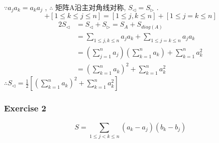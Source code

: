 \begin{solve}
    $ \because a_j a_k = a_k a_j $ , $ \therefore  $ 矩阵A沿主对角线对称, $ S_{\triangleleft} = S_{\triangleright} $ .
    \begin{equation*}
        [1\leqslant j \leqslant k \leqslant n] + [1\leqslant k \leqslant j \leqslant n] =[1\leqslant j , k \leqslant n] + [1\leqslant j = k \leqslant n]
    \end{equation*}
    \begin{align*}
        2S_{\triangleleft} &= S_{\triangleleft}+S_{\triangleright} = S_{A}+S_{diag(A)} \\
        &= \sum_{1\leqslant j , k \leqslant n} a_j a_k + \sum_{1\leqslant j = k \leqslant n} a_j a_k\\
        &= \left(\sum_{j=1}^{n} a_j\right)\left(\sum_{k=1}^{n} a_k\right) + \sum_{k=1}^{n} a_k^2\\
        &= \left(\sum_{k=1}^{n} a_k\right)^2 + \sum_{k=1}^{n} a_k^2
    \end{align*}
    $ \therefore S_{\triangleleft} = \frac{1}{2}[\left(\sum_{k=1}^{n} a_k\right)^2 + \sum_{k=1}^{n} a_k^2] $ 
\end{solve}

\subsubsection{Exercise 2}

\begin{equation}
    S = \sum_{1\leqslant j < k \leqslant n} (a_k-a_j)(b_k-b_j)
\end{equation}

